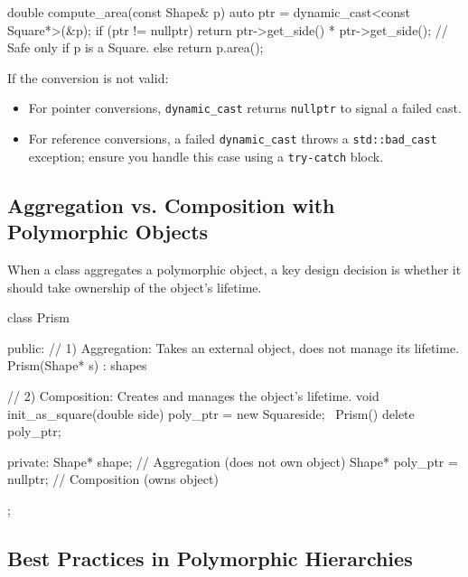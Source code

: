 \begin{codeblock}[language=C++]
double compute_area(const Shape& p) {
    auto ptr = dynamic_cast<const Square*>(&p);
    if (ptr != nullptr) {
        return ptr->get_side() * ptr->get_side(); // Safe only if p is a Square.
    } else {
        return p.area();
    }
}
\end{codeblock}

If the conversion is not valid:
\begin{itemize}
    \item For pointer conversions, \texttt{dynamic\_cast} returns \texttt{nullptr} to signal a failed cast.
    \item For reference conversions, a failed \texttt{dynamic\_cast} throws a \texttt{std::bad\_cast} exception; ensure you handle this case using a \texttt{try-catch} block.
\end{itemize}

\subsection{Aggregation vs. Composition with Polymorphic Objects}

When a class aggregates a polymorphic object, a key design decision is whether it should take ownership of the object's lifetime.

\begin{codeblock}[language=C++]
class Prism {
public:
    // 1) Aggregation: Takes an external object, does not manage its lifetime.
    Prism(Shape* s) : shape{s} {}

    // 2) Composition: Creates and manages the object's lifetime.
    void init_as_square(double side) {
        poly_ptr = new Square{side};
    }
    ~Prism() { delete poly_ptr; }

private:
    Shape* shape;  // Aggregation (does not own object)
    Shape* poly_ptr = nullptr; // Composition (owns object)
};
\end{codeblock}

\subsection{Best Practices in Polymorphic Hierarchies}

